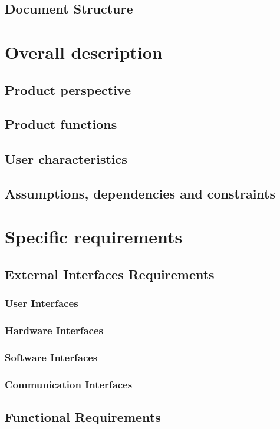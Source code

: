 \documentclass{article}
\begin{document}
        \subsection{Document Structure}
    
    \section{Overall description}
        \subsection{Product perspective}
        \subsection{Product functions}
        \subsection{User characteristics}
        \subsection{Assumptions, dependencies and constraints}
        
    \section{Specific requirements}
        \subsection{External Interfaces Requirements}
            \subsubsection{User Interfaces}
            \subsubsection{Hardware Interfaces}
            \subsubsection{Software Interfaces}
            \subsubsection{Communication Interfaces}
        \subsection{Functional Requirements}
\end{document}
